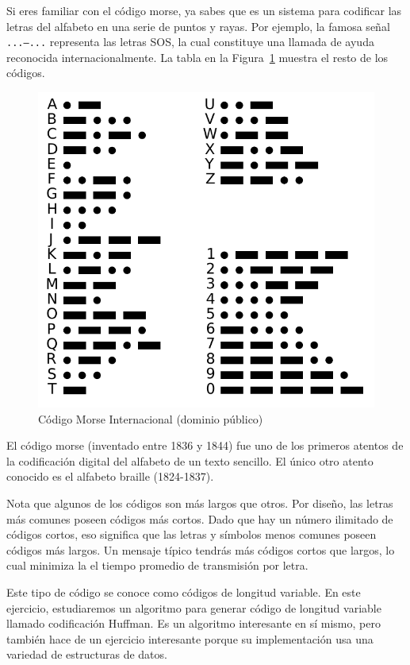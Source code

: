 Si eres familiar con el código morse, ya sabes que es un sistema
para codificar las letras del alfabeto en una serie de puntos
y rayas. Por ejemplo, la famosa señal {\tt ...---...} representa
las letras SOS, la cual constituye una llamada de ayuda reconocida
internacionalmente. La tabla en la Figura~\ref{fig.morse} 
muestra el resto de los códigos.

\begin{figure}
\centerline
{\includegraphics[scale=0.6]{figs/International_Morse_Code.pdf}}
\caption{Código Morse Internacional (dominio público)}
\label{fig.morse}
\end{figure}

El código morse (inventado entre 1836 y 1844) fue uno de los
primeros atentos de la codificación digital del alfabeto de 
un texto sencillo. El único otro atento conocido es el 
alfabeto braille (1824-1837).

Nota que algunos de los códigos son más largos que otros. Por
diseño, las letras más comunes poseen códigos más cortos. Dado
que hay un número ilimitado de códigos cortos, eso significa que
las letras y símbolos menos comunes poseen códigos más largos.
Un mensaje típico tendrás más códigos cortos que largos, lo cual
minimiza la el tiempo promedio de transmisión por letra.

Este tipo de código se conoce como códigos de longitud variable. 
En este ejercicio, estudiaremos un algoritmo para generar código
de longitud variable llamado codificación Huffman. Es un algoritmo
interesante en sí mismo, pero también hace de un ejercicio interesante
porque su implementación usa una variedad de estructuras de datos.

